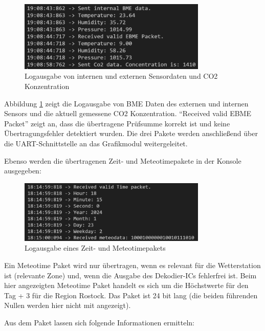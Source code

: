 \documentclass[a4paper,11pt]{article}
\begin{document}
\begin{figure}[H]
  \centering
  \includegraphics[width=0.8\textwidth]{SensorLog.png}
  \caption{Logausgabe von internen und externen Sensordaten und CO2 Konzentration}
  \label{fig:sensorlog}
\end{figure}

\noindent
Abbildung \ref{fig:sensorlog} zeigt die Logausgabe von BME Daten des externen und internen Sensors und die aktuell gemessene CO2 Konzentration. 
``Received valid EBME Packet'' zeigt an, dass die übertragene Prüfsumme korrekt ist und keine Übertragungsfehler detektiert wurden. 
Die drei Pakete werden anschließend über die UART-Schnittstelle an das Grafikmodul weitergeleitet. 

\vspace{0.2cm}
\noindent
Ebenso werden die übertragenen Zeit- und Meteotimepakete in der Konsole ausgegeben:

\begin{figure}[H]
  \centering
  \includegraphics[width=0.8\textwidth]{MeteotimeLog.png}
  \caption{Logausgabe eines Zeit- und Meteotimepakets}
  \label{fig:meteolog}
\end{figure}

\noindent
Ein Meteotime Paket wird nur übertragen, wenn es relevant für die Wetterstation ist (relevante Zone) und, wenn die Ausgabe des Dekodier-ICs fehlerfrei ist. 
Beim hier angezeigten Meteotime Paket handelt es sich um die Höchstwerte für den Tag + 3 für die Region Rostock. Das Paket ist 24 bit lang (die beiden führenden Nullen
werden hier nicht mit angezeigt). 

\vspace{0.2cm}
\noindent
Aus dem Paket lassen sich folgende Informationen ermitteln:
\end{document}
